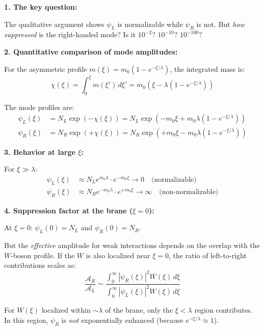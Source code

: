 \begin{tcolorbox}[colback=green!5, colframe=green!50!black,
  title={Quantitative V$-$A: How Strong Is the Chiral Selection?}, breakable]
\label{box:va_quantitative}

\textbf{1. The key question:}

The qualitative argument shows $\psi_L$ is normalizable while $\psi_R$ is not.
But \emph{how suppressed} is the right-handed mode? Is it $10^{-2}$? $10^{-10}$? $10^{-100}$?

\textbf{2. Quantitative comparison of mode amplitudes:}

For the asymmetric profile $m(\xi) = m_0(1 - e^{-\xi/\lambda})$, the integrated mass is:
\begin{equation}
\chi(\xi) = \int_0^\xi m(\xi')\,d\xi' = m_0\left(\xi - \lambda(1 - e^{-\xi/\lambda})\right)
\end{equation}

The mode profiles are:
\begin{align}
\psi_L(\xi) &= N_L \exp\left(-\chi(\xi)\right) = N_L \exp\left(-m_0 \xi + m_0\lambda(1-e^{-\xi/\lambda})\right) \\
\psi_R(\xi) &= N_R \exp\left(+\chi(\xi)\right) = N_R \exp\left(+m_0 \xi - m_0\lambda(1-e^{-\xi/\lambda})\right)
\end{align}

\textbf{3. Behavior at large $\xi$:}

For $\xi \gg \lambda$:
\begin{align}
\psi_L(\xi) &\approx N_L e^{m_0\lambda} \cdot e^{-m_0 \xi} \to 0 \quad \text{(normalizable)} \\
\psi_R(\xi) &\approx N_R e^{-m_0\lambda} \cdot e^{+m_0 \xi} \to \infty \quad \text{(non-normalizable)}
\end{align}

\textbf{4. Suppression factor at the brane ($\xi = 0$):}

At $\xi = 0$: $\psi_L(0) = N_L$ and $\psi_R(0) = N_R$.

But the \emph{effective} amplitude for weak interactions depends on the overlap with
the $W$-boson profile. If the $W$ is also localized near $\xi = 0$, the ratio of
left-to-right contributions scales as:
\begin{equation}
\frac{\mathcal{A}_R}{\mathcal{A}_L} \sim \frac{\int_0^\infty |\psi_R(\xi)|^2 W(\xi) \, d\xi}{\int_0^\infty |\psi_L(\xi)|^2 W(\xi) \, d\xi}
\end{equation}

For $W(\xi)$ localized within $\sim \lambda$ of the brane, only the $\xi < \lambda$ region
contributes. In this region, $\psi_R$ is \emph{not} exponentially enhanced (because
$e^{-\xi/\lambda} \approx 1$).


\end{tcolorbox}
